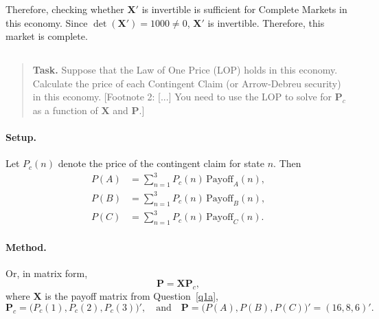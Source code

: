 \documentclass[11pt]{article}
\newcommand{\task}[1]{\begin{quote}\small\textbf{Task.} #1\end{quote}}
\begin{document}
Therefore, checking whether $\mathbf{X}'$ is invertible is sufficient for Complete Markets in this
economy. Since $\det(\mathbf{X}') = 1000 \neq 0$, $\mathbf{X}'$ is invertible. Therefore, this market is
complete.

\subsection{}\label{q1b}
\task{Suppose that the Law of One Price (LOP) holds in this economy. Calculate the price of each Contingent Claim (or Arrow-Debreu security) in this economy. [Footnote 2: [...] You need to use the LOP to solve for $\mathbf{P}_c$ as a function of $\mathbf{X}$ and $\mathbf{P}$.]}
\paragraph{Setup.}
Let $P_c(n)$ denote the price of the contingent claim for state $n$. Then
\begin{align*}
  P(A) &= \sum_{n=1}^{3} P_c(n)\,\mathrm{Payoff}_A(n), \\
  P(B) &= \sum_{n=1}^{3} P_c(n)\,\mathrm{Payoff}_B(n), \\
  P(C) &= \sum_{n=1}^{3} P_c(n)\,\mathrm{Payoff}_C(n).
\end{align*}

\paragraph{Method.}
Or, in matrix form,
\[
  \mathbf{P} = \mathbf{X} \mathbf{P}_c,
\]
where $\mathbf{X}$ is the payoff matrix from Question~\ref{q1a},
\[
  \mathbf{P}_c = \big(P_c(1), P_c(2), P_c(3)\big)', \quad\text{and}\quad
  \mathbf{P} = \big(P(A), P(B), P(C)\big)' = (16, 8, 6)'.
\]
\end{document}
